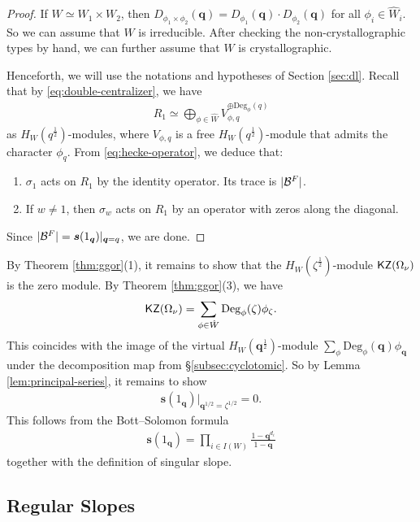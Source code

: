 \documentclass[a4paper,10pt,leqno]{amsart}
\theoremstyle{plain}
\theoremstyle{plain}
\theoremstyle{plain}
\theoremstyle{definition}
\theoremstyle{remark}
\newcommand{\Q}{\bm{q}}
\newcommand{\UDeg}{\mathrm{Deg}}
\newcommand{\slope}{\nu}
\begin{document}
\begin{proof}
If $W \simeq W_1 \times W_2$, then $D_{\phi_1 \times \phi_2}(\Q) = D_{\phi_1}(\Q) \cdot D_{\phi_2}(\Q)$ for all $\phi_i \in \hat{W}_i$.
So we can assume that $W$ is irreducible.
After checking the non-crystallographic types by hand, we can further assume that $W$ is crystallographic.

Henceforth, we will use the notations and hypotheses of Section \ref{sec:dl}.
Recall that by \eqref{eq:double-centralizer}, we have
\begin{align}
R_1 \simeq \bigoplus_{\phi \in \hat{W}}
V_{\phi, q}^{\oplus \UDeg_\phi(q)}
\end{align}
as $H_W(q^{\frac{1}{2}})$-modules, where $V_{\phi, q}$ is a free $H_W(q^{\frac{1}{2}})$-module that admits the character $\phi_q$.
From \eqref{eq:hecke-operator}, we deduce that:
\begin{enumerate}
\item 	$\sigma_1$ acts on $R_1$ by the identity operator.
		Its trace is $|\cal{B}^F|$.
\item 	If $w \neq 1$, then $\sigma_w$ acts on $R_1$ by an operator with zeros along the diagonal.
\end{enumerate}
Since $|\cal{B}^F| = \bm{s}(1_{\Q})|_{\Q = q}$, we are done.
\end{proof}

By Theorem \ref{thm:ggor}(1), it remains to show that the $H_W(\zeta^{\frac{1}{2}})$-module $\sf{KZ}(\Omega_\slope)$ is the zero module.
By Theorem \ref{thm:ggor}(3), we have
\begin{align}
\sf{KZ}(\Omega_\slope) = \sum_{\phi \in \hat{W}}
\UDeg_\phi(\zeta)\phi_\zeta.
\end{align}
This coincides with the image of the virtual $H_W(\Q^{\frac{1}{2}})$-module $\sum_\phi \UDeg_\phi(\Q)\phi_{\Q}$ under the decomposition map from \S\ref{subsec:cyclotomic}.
So by Lemma \ref{lem:principal-series}, it remains to show
\begin{align}
\bm{s}(1_{\Q})|_{\Q^{1/2} = \zeta^{1/2}} = 0.
\end{align}
This follows from the Bott--Solomon formula \cite{solomon}
\begin{align}\label{eq:bott-solomon}
\bm{s}(1_{\Q}) = \prod_{i \in I(W)} 
\frac{1 - \Q^{d_i}}{1 - \Q}
\end{align}
together with the definition of singular slope.

\subsection{Regular Slopes}
\end{document}
